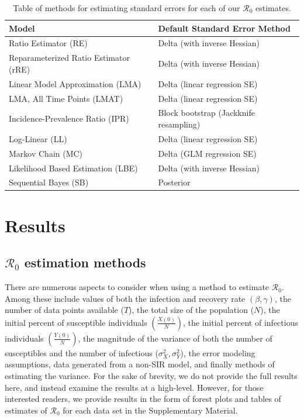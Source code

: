 \documentclass[12pt]{article}
\newcommand{\rr}{\ensuremath{\mathcal{R}_0}}
\begin{document}
\begin{table}[H]
	\centering
	\begin{tabular}{@{}ll@{}}
		\toprule
		\textbf{Model} & \textbf{Default Standard Error Method} \\ \midrule
		Ratio Estimator (RE) & Delta (with inverse Hessian)\\
		Reparameterized Ratio Estimator (rRE) & Delta (with inverse Hessian) \\
		Linear Model Approximation (LMA) & Delta (linear regression SE) \\
		LMA, All Time Points  (LMAT)& Delta (linear regression SE)\\
		Incidence-Prevalence Ratio (IPR) & Block bootstrap (Jackknife resampling) \\
		Log-Linear (LL) & Delta (linear regression SE) \\
          Markov Chain (MC) & Delta (GLM regression SE) \\
          Likelihood Based Estimation (LBE) & Delta (with inverse Hessian)\\
		Sequential Bayes (SB) & Posterior\\
		\bottomrule
	\end{tabular}
	\caption{Table of methods for estimating standard errors for each of our $\rr$ estimates.}
	\label{tab:se-methods}
\end{table}



\section{Results}\label{sec:results-top}
\subsection{$\rr$ estimation methods}\label{sec:results}
There are numerous aspects to consider when using a method to estimate $\rr$.  Among these include values of both the infection and recovery rate $(\beta, \gamma)$, the number of data points available ($T$), the total size of the population ($N$), the initial percent of susceptible individuals $\left (\frac{X(0)}{N}\right)$, the initial percent of infectious individuals $\left (\frac{Y(0)}{N}\right )$, the magnitude of the variance of both the number of susceptibles and the number of infectious ($\sigma_X^2, \sigma_Y^2$), the error modeling assumptions, data generated from a non-SIR model, and finally methods of estimating the variance.  For the sake of brevity, we do not provide the full results here, and instead examine the results at a high-level.  However, for those interested readers, we provide results in the form of forest plots and tables of estimates of $\rr$ for each data set in the Supplementary Material.
\end{document}
